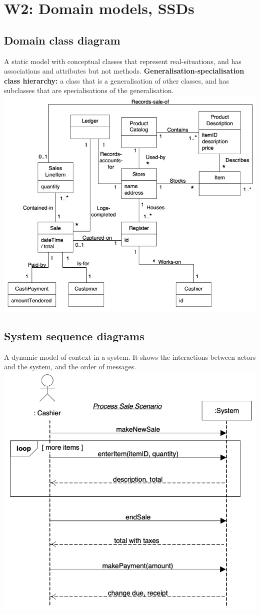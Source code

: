 \section{W2: Domain models, SSDs}

\subsection{Domain class diagram}
A static model with conceptual classes that represent real-situations, and has associations and attributes but not methods.
\textbf{Generalisation-specialisation class hierarchy:} a class that is a generalisation of other classes, and has subclasses that are specialisations of the generalisation.\\
\includegraphics[width=\linewidth]{figs/domain-model.png}

\subsection{System sequence diagrams}
A dynamic model of context in a system. It shows the interactions between actors and the system, and the order of messages.\\
\includegraphics[width=\linewidth]{figs/system-sequence-diagram.png}
